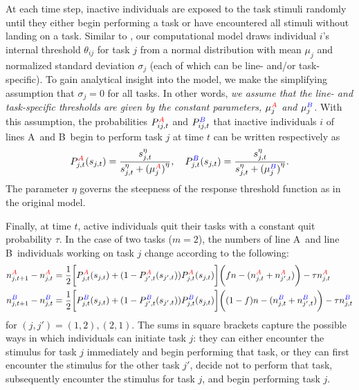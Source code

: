 \documentclass[11pt]{article}
\newcommand{\A}{{\color{red}A}}
\newcommand{\B}{{\color{blue}B}}
\begin{document}
\begin{appendices}
At each time step, inactive individuals are exposed to the task stimuli randomly until they  either begin performing a task or have encountered all stimuli without landing on a task. Similar to \cite{ulrich18}, our computational model draws individual $i$'s internal threshold $\theta_{ij}$ for task $j$ from a normal distribution with mean $\mu_j$ and normalized standard deviation $\sigma_j$ (each of which can be line- and/or task-specific). To gain analytical insight into the model, we make the simplifying assumption that $\sigma_j = 0$ for all tasks.
In other words, \textit{we assume that the line- and task-specific thresholds are given by the constant parameters, $\mu_j^{\A}$ and $\mu_j^{\B}$.}
With this assumption, the probabilities $P_{ij,t}^{\A}$ and $P_{ij,t}^{\B}$ that inactive individuals $i$ of lines \A\ and \B\ begin to perform task $j$ at time $t$ can be written respectively as
\begin{equation}
    P_{j,t}^{\A} (s_{j,t}) = \frac{s_{j,t}^\eta}{s_{j,t}^\eta + {(\mu_j^{\A})}^\eta}, \quad P_{j,t}^{\B} (s_{j,t}) = \frac{s_{j,t}^\eta}{s_{j,t}^\eta +{(\mu_j^{\B})}^\eta}.
\end{equation}
The parameter $\eta$ governs the steepness of the response threshold function as in the original model.

Finally, at time $t$, active individuals quit their tasks with a constant quit probability $\tau$. In the case of two tasks ($m = 2$), the numbers of line \A\ and line \B\ individuals working on task $j$ change according to the following:
\begin{align}
    n_{j,t+1}^{\A} - n_{j,t}^{\A}  & =  \frac{1}{2} \bigg[ P_{j,t}^{\A}(s_{j,t}) + (1 - P_{j',t}^{\A}(s_{j',t}))P_{j,t}^{\A}(s_{j,t})\bigg] \bigg( fn
 - (n_{j,t}^{\A} + n_{j',t}^{\A}) \bigg) - \tau n_{j,t}^{\A} \nonumber\\
    n_{j,t+1}^{\B} - n_{j,t}^{\B}  & = \frac{1}{2} \bigg[ P_{j,t}^{\B}(s_{j,t}) + (1 - P_{j',t}^{\B}(s_{j',t}))P_{j,t}^{\B}(s_{j,t})\bigg] \bigg( (1-f)n - (n_{j,t}^{\B} + n_{j',t}^{\B}) \bigg) - \tau n_{j,t}^{\B} \label{eq:active}
\end{align}
for $(j,j')=(1,2), (2,1)$. {\color{black}The sums in square brackets capture the possible ways in which individuals can initiate task $j$: they can either encounter the stimulus for task $j$ immediately and begin performing that task, or they can first encounter the stimulus for the other task $j'$, decide not to perform that task, subsequently encounter the stimulus for task $j$, and begin performing task $j$.}


\end{appendices}
\end{document}
